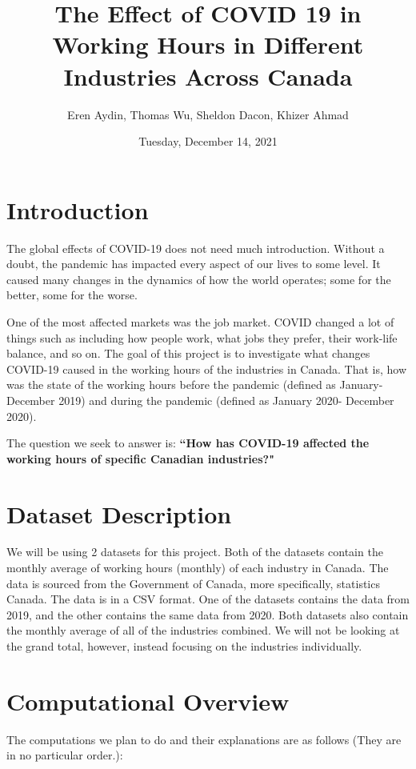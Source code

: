 \documentclass[fontsize=11pt]{article}
\title{  
The Effect of COVID 19 in Working Hours in Different Industries Across Canada}
\author{Eren Aydin, Thomas Wu, Sheldon Dacon, Khizer Ahmad}
\date{Tuesday, December 14, 2021}
\begin{document}
  
\maketitle  
  
\section*{Introduction}  
The global effects of COVID-19 does not need much introduction. Without a doubt, the pandemic has impacted every aspect of our lives to some level. It caused many changes in the dynamics of how the world operates; some for the better, some for the worse.   
  
One of the most affected markets was the job market. COVID changed a lot of things such as including how people work, what jobs they prefer, their work-life balance, and so on. The goal of this project is to investigate what changes COVID-19 caused in the working hours of the industries in Canada. That is, how was the state of the working hours before the pandemic (defined as January-December 2019) and during the pandemic (defined as January 2020- December 2020).  
  
The question we seek to answer is:   
\textbf{``How has COVID-19 affected the working hours of specific Canadian industries?"}  
  
  
\section*{Dataset Description}  
We will be using 2 datasets for this project. Both of the datasets contain the monthly average of working hours (monthly) of each industry in Canada. The data is sourced from the Government of Canada, more specifically, statistics Canada. The data is in a CSV format. One of the datasets contains the data from 2019, and the other contains the same data from 2020. Both datasets also contain the monthly average of all of the industries combined. We will not be looking at the grand total, however, instead focusing on the industries individually.   
 
 

 
 
  
\section*{Computational Overview}  
The computations we plan to do and their explanations are as follows (They are in no particular order.):  
  
\end{document}
